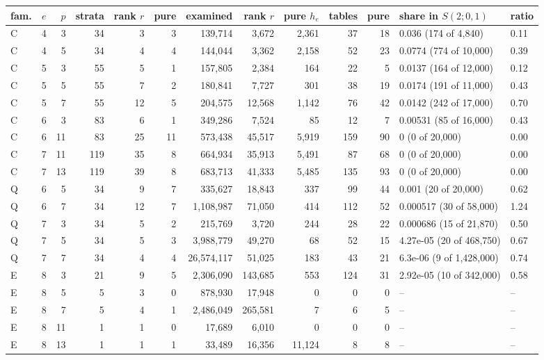 \begin{tabular}{@{}lrrrrrrrrrrll@{}}
\toprule
fam. & $e$ & $p$ & strata & rank $r$ & pure & examined & rank $r$ & pure $h_e$ & tables & pure & share in $S(2;0,1)$ & ratio\\
\midrule
C & 4 & 3 & 34 & 3 & 3 & 139{,}714 & 3{,}672 & 2{,}361 & 37 & 18 & 0.036 (174 of 4{,}840) & 0.11\\
C & 4 & 5 & 34 & 4 & 4 & 144{,}044 & 3{,}362 & 2{,}158 & 52 & 23 & 0.0774 (774 of 10{,}000) & 0.39\\
C & 5 & 3 & 55 & 5 & 1 & 157{,}805 & 2{,}384 & 164 & 22 & 5 & 0.0137 (164 of 12{,}000) & 0.12\\
C & 5 & 5 & 55 & 7 & 2 & 180{,}841 & 7{,}727 & 301 & 38 & 19 & 0.0174 (191 of 11{,}000) & 0.43\\
C & 5 & 7 & 55 & 12 & 5 & 204{,}575 & 12{,}568 & 1{,}142 & 76 & 42 & 0.0142 (242 of 17{,}000) & 0.70\\
C & 6 & 3 & 83 & 6 & 1 & 349{,}286 & 7{,}524 & 85 & 12 & 7 & 0.00531 (85 of 16{,}000) & 0.43\\
C & 6 & 11 & 83 & 25 & 11 & 573{,}438 & 45{,}517 & 5{,}919 & 159 & 90 & 0 (0 of 20{,}000) & 0.00\\
C & 7 & 11 & 119 & 35 & 8 & 664{,}934 & 35{,}913 & 5{,}491 & 87 & 68 & 0 (0 of 20{,}000) & 0.00\\
C & 7 & 13 & 119 & 39 & 8 & 683{,}713 & 41{,}333 & 5{,}485 & 135 & 93 & 0 (0 of 20{,}000) & 0.00\\
Q & 6 & 5 & 34 & 9 & 7 & 335{,}627 & 18{,}843 & 337 & 99 & 44 & 0.001 (20 of 20{,}000) & 0.62\\
Q & 6 & 7 & 34 & 12 & 7 & 1{,}108{,}987 & 71{,}050 & 414 & 112 & 52 & 0.000517 (30 of 58{,}000) & 1.24\\
Q & 7 & 3 & 34 & 5 & 2 & 215{,}769 & 3{,}720 & 244 & 28 & 22 & 0.000686 (15 of 21{,}870) & 0.50\\
Q & 7 & 5 & 34 & 5 & 3 & 3{,}988{,}779 & 49{,}270 & 68 & 52 & 15 & 4.27e-05 (20 of 468{,}750) & 0.67\\
Q & 7 & 7 & 34 & 4 & 4 & 26{,}574{,}117 & 51{,}025 & 183 & 43 & 21 & 6.3e-06 (9 of 1{,}428{,}000) & 0.74\\
E & 8 & 3 & 21 & 9 & 5 & 2{,}306{,}090 & 143{,}685 & 553 & 124 & 31 & 2.92e-05 (10 of 342{,}000) & 0.58\\
E & 8 & 5 & 5 & 3 & 0 & 878{,}930 & 17{,}948 & 0 & 0 & 0 & -- & --\\
E & 8 & 7 & 5 & 4 & 1 & 2{,}486{,}049 & 265{,}581 & 7 & 6 & 5 & -- & --\\
E & 8 & 11 & 1 & 1 & 0 & 17{,}689 & 6{,}010 & 0 & 0 & 0 & -- & --\\
E & 8 & 13 & 1 & 1 & 1 & 33{,}489 & 16{,}356 & 11{,}124 & 8 & 8 & -- & --\\
\bottomrule
\end{tabular}
